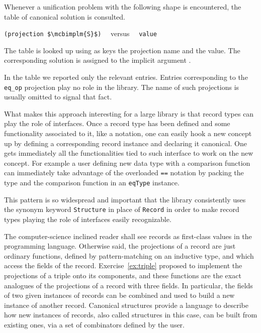 Whenever a unification problem with the following shape is encountered,
the table of canonical solution is consulted.
\begin{center}
\lstinline/(projection $\mcbimplm{S}$)/ ~~versus~~ \lstinline/value/
\end{center}
The table is looked up using as keys the projection name and the
value.  The corresponding solution is assigned to the implicit
argument .

In the table we reported only the relevant entries.  Entries
corresponding to the \lstinline/eq_op/ projection play no role
in the \mcbMC{} library. The name of such projections is
usually omitted to signal that fact.

What makes this approach interesting for a large library is that
record types can play the role of interfaces.  Once a record type has
been defined and some functionality associated to it, like a notation,
one can easily hook a new concept up by defining a corresponding
record instance and declaring it canonical.  One gets immediately all
the functionalities tied to such interface to work on the new concept.
For example a user defining new data type with a comparison function
can immediately take advantage of the overloaded \lstinline/==/
notation by packing the type and the comparison function in an
\lstinline/eqType/ instance.

This pattern is so widespread and important that the \mcbMC{}
library
consistently uses the synonym keyword \lstinline/Structure/ in place of
\lstinline/Record/ in order to make record types playing the role
of interfaces easily recognizable.

The computer-science inclined reader shall see records as first-class
values in the  \mcbCIC{} programming language. Otherwise said,
the projections of a record are just ordinary functions, defined by
pattern-matching on an inductive type, and which access the fields
of the record. Exercise~\ref{ex:triple} proposed to implement the
projections of a triple onto its components, and these functions are
the exact analogues of the projections of a record with three fields.
In particular,  the fields of two given instances of records can be
combined and used to build a new instance of another record. Canonical
structures provide a language to describe how new instances of
records, also called structures in this case, can
be built from existing ones, via a set of combinators defined by the
user. %

